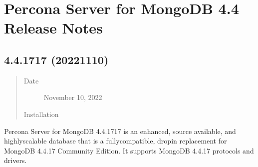 \documentclass[letterpaper,10pt,english]{sphinxmanual}
\begin{document}
\chapter{Percona Server for MongoDB 4.4 Release Notes}
\label{\detokenize{release_notes/index:percona-server-for-mongodb-version-release-notes}}\label{\detokenize{release_notes/index:rel-notes}}\label{\detokenize{release_notes/index::doc}}

\section{ 4.4.17\sphinxhyphen{}17 (2022\sphinxhyphen{}11\sphinxhyphen{}10)}
\label{\detokenize{release_notes/4.4.17-17:percona-server-for-mongodb-4-4-17-17-2022-11-10}}\label{\detokenize{release_notes/4.4.17-17:psmdb-4-4-17-17}}\label{\detokenize{release_notes/4.4.17-17::doc}}\begin{quote}\begin{description}
\item[{Date}] \leavevmode
\sphinxAtStartPar
November 10, 2022

\item[{Installation}] \leavevmode
\sphinxAtStartPar
{}

\end{description}\end{quote}

\sphinxAtStartPar
Percona Server for MongoDB 4.4.17\sphinxhyphen{}17 is an enhanced, source available, and highly\sphinxhyphen{}scalable database that is a
fully\sphinxhyphen{}compatible, drop\sphinxhyphen{}in replacement for MongoDB 4.4.17 Community Edition.
It supports MongoDB 4.4.17 protocols and drivers.
\end{document}
